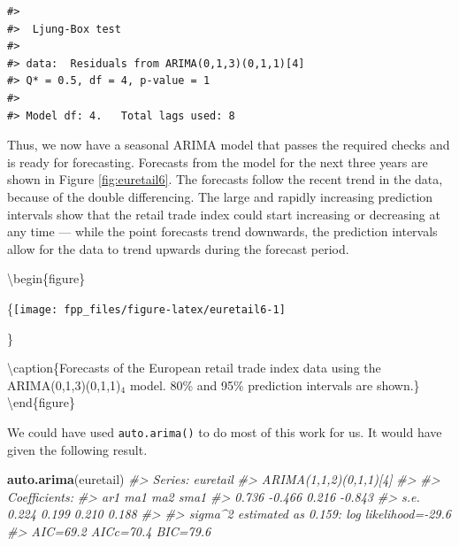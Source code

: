 \documentclass[]{book}
\newenvironment{Shaded}{\begin{snugshade}}{\end{snugshade}}
\newcommand{\CommentTok}[1]{\textcolor[rgb]{0.56,0.35,0.01}{\textit{#1}}}
\newcommand{\DataTypeTok}[1]{\textcolor[rgb]{0.13,0.29,0.53}{#1}}
\newcommand{\DecValTok}[1]{\textcolor[rgb]{0.00,0.00,0.81}{#1}}
\newcommand{\KeywordTok}[1]{\textcolor[rgb]{0.13,0.29,0.53}{\textbf{#1}}}
\newcommand{\NormalTok}[1]{#1}
\newcommand{\OperatorTok}[1]{\textcolor[rgb]{0.81,0.36,0.00}{\textbf{#1}}}
\newcommand{\StringTok}[1]{\textcolor[rgb]{0.31,0.60,0.02}{#1}}
\begin{document}
\begin{verbatim}
#> 
#>  Ljung-Box test
#> 
#> data:  Residuals from ARIMA(0,1,3)(0,1,1)[4]
#> Q* = 0.5, df = 4, p-value = 1
#> 
#> Model df: 4.   Total lags used: 8
\end{verbatim}

Thus, we now have a seasonal ARIMA model that passes the required checks and is ready for forecasting. Forecasts from the model for the next three years are shown in Figure \ref{fig:euretail6}. The forecasts follow the recent trend in the data, because of the double differencing. The large and rapidly increasing prediction intervals show that the retail trade index could start increasing or decreasing at any time --- while the point forecasts trend downwards, the prediction intervals allow for the data to trend upwards during the forecast period.

\begin{Shaded}
\end{Shaded}

\textbackslash{}begin\{figure\}

\{\centering \texttt{[image: fpp\_files/figure-latex/euretail6-1]}

\}

\textbackslash{}caption\{Forecasts of the European retail trade index data using the ARIMA(0,1,3)(0,1,1)\(_4\) model. 80\% and 95\% prediction intervals are shown.\}\label{fig:euretail6}
\textbackslash{}end\{figure\}

We could have used \texttt{auto.arima()} to do most of this work for us. It would have given the following result.

\begin{Shaded}
\begin{Highlighting}[]
\KeywordTok{auto.arima}\NormalTok{(euretail)}
\CommentTok{#> Series: euretail }
\CommentTok{#> ARIMA(1,1,2)(0,1,1)[4] }
\CommentTok{#> }
\CommentTok{#> Coefficients:}
\CommentTok{#>         ar1     ma1    ma2    sma1}
\CommentTok{#>       0.736  -0.466  0.216  -0.843}
\CommentTok{#> s.e.  0.224   0.199  0.210   0.188}
\CommentTok{#> }
\CommentTok{#> sigma^2 estimated as 0.159:  log likelihood=-29.6}
\CommentTok{#> AIC=69.2   AICc=70.4   BIC=79.6}
\end{Highlighting}
\end{Shaded}
\end{document}
